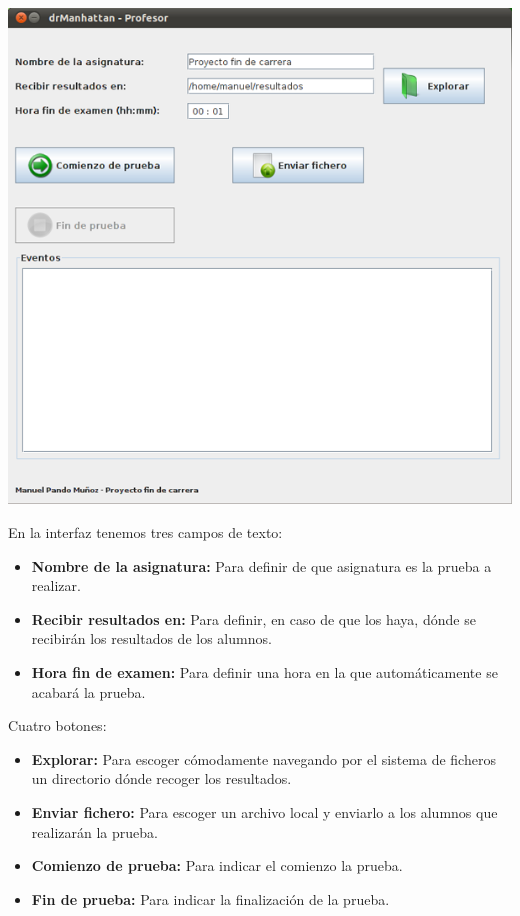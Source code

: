 \documentclass[a4paper,11pt]{article}
\begin{document}
\begin{center}
    \includegraphics[width=.90\linewidth]{imagenes/GUIProfesor}
\end{center}

En la interfaz tenemos tres campos de texto:
\begin{itemize}
    \item {\bfseries Nombre de la asignatura:} Para definir de que asignatura es la prueba a realizar.
    \item {\bfseries Recibir resultados en:} Para definir, en caso de que los haya, dónde se recibirán los resultados de los alumnos.
    \item {\bfseries Hora fin de examen:} Para definir una hora en la que automáticamente se acabará la prueba.
\end{itemize}

Cuatro botones:

\begin{itemize}
    \item {\bfseries Explorar:} Para escoger cómodamente navegando por el sistema de ficheros un directorio dónde recoger los resultados.
    \item {\bfseries Enviar fichero:} Para escoger un archivo local y enviarlo a los alumnos que realizarán la prueba.
    \item {\bfseries Comienzo de prueba:} Para indicar el comienzo la prueba.
    \item {\bfseries Fin de prueba:} Para indicar la finalización de la prueba.
\end{itemize}
\end{document}
